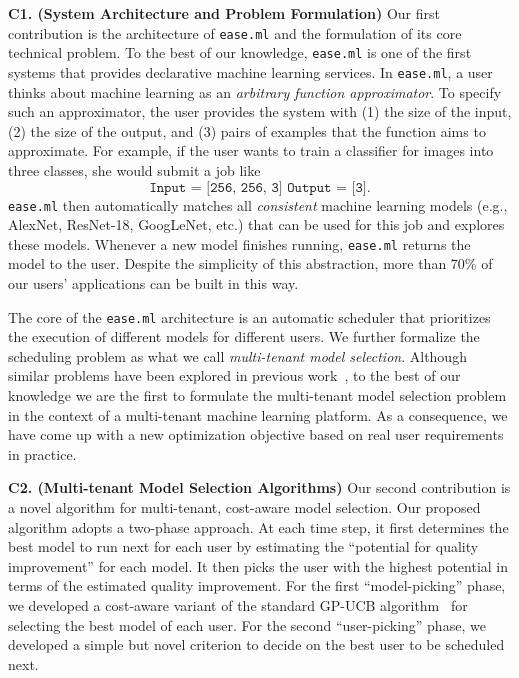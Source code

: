 \documentclass[letterpaper]{vldb}
\newcommand{\eml}{\texttt{ease.ml}\xspace}
\begin{document}
\noindent
{\bf C1. (System Architecture and Problem Formulation)}
Our first contribution is the architecture of \eml and the formulation of its core technical problem.
To the best of our knowledge, \eml is one of the first systems that provides declarative machine learning services.
In \eml, a user thinks about machine learning as an {\em arbitrary function approximator}.
To specify such an approximator, the user provides the
system with (1) the size of the input, (2) the size of the output,
and (3) pairs of examples that the function aims to approximate.
For example, if the user wants to train a classifier
for images into three classes, she would submit a job like
\vspace{-0.5em}
\[
\texttt{Input = [256, 256, 3]
        Output = [3]}.
\]
\eml then automatically matches all {\em consistent} machine learning models (e.g., AlexNet, ResNet-18, GoogLeNet, etc.) 
that can be used for this job and explores these models.
Whenever a new model finishes running, \eml returns the model to the user.
Despite the simplicity of this abstraction, more than 70\% of
our users' applications can be built in this way.



The core of the \eml architecture is an automatic scheduler that prioritizes the execution of different models for different users.
We further formalize the scheduling problem as what we call {\em multi-tenant model selection}.
Although similar problems have been explored in previous work~\cite{Swersky2013}, to the best of our knowledge we are the first to formulate the multi-tenant model selection problem in the context of a multi-tenant machine learning platform.
As a consequence, we have come up with a new optimization objective based on real user requirements in practice.


\noindent
{\bf C2. (Multi-tenant Model Selection Algorithms)} Our second contribution
is a novel algorithm for 
multi-tenant, cost-aware model selection.
Our proposed algorithm adopts a two-phase approach.
At each time step, it first determines the 
best model to run next for each user by
estimating the ``potential for quality improvement'' for each model.
It then picks the user with the highest potential in terms of the estimated quality improvement.
For the first ``model-picking'' phase, we developed a cost-aware variant of the 
standard GP-UCB algorithm~\cite{SrinivasKKS10} for selecting the best model of 
each user. For the second ``user-picking'' phase, we developed a simple but novel criterion to decide on the best user to be scheduled next.
\end{document}
